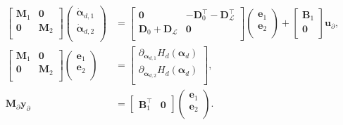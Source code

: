 \begin{equation}\label{eq:pHsys_findim_J1}
\begin{aligned}
\begin{bmatrix}
\mathbf{M}_1 & \mathbf{0} \\
\mathbf{0} & \mathbf{M}_2 \\
\end{bmatrix}
\begin{pmatrix}
\dot{\bm{\alpha}}_{d, 1} \\
\dot{\bm{\alpha}}_{d, 2} \\
\end{pmatrix}
&= \begin{bmatrix}
\mathbf{0} & -\mathbf{D}_{0}^\top - \mathbf{D}_{\mathcal{L}}^\top \\
\mathbf{D}_{0} + \mathbf{D}_{\mathcal{L}} & \mathbf{0} \\
\end{bmatrix} 
\begin{pmatrix}
\mathbf{e}_{1} \\
\mathbf{e}_{2} \\
\end{pmatrix} + 
\begin{bmatrix}
\mathbf{B}_1\\
\mathbf{0}\\
\end{bmatrix}
\mathbf{u}_\partial, \\
\begin{bmatrix}
\mathbf{M}_1 & \mathbf{0} \\
\mathbf{0} & \mathbf{M}_2 \\
\end{bmatrix}
\begin{pmatrix}
\mathbf{e}_{1} \\
\mathbf{e}_{2} \\
\end{pmatrix}
&= \begin{bmatrix}
\partial_{\bm{\alpha}_{d, 1}} H_d(\bm{\alpha}_d)\\
\partial_{\bm{\alpha}_{d, 2}} H_d(\bm{\alpha}_d)\\
\end{bmatrix}, \\
\mathbf{M}_\partial {\mathbf{y}_\partial} &= \begin{bmatrix}
\mathbf{B}_1^\top & \mathbf{0}
\end{bmatrix}\begin{pmatrix}
\mathbf{e}_{1} \\
\mathbf{e}_{2} \\
\end{pmatrix}.
\end{aligned}
\end{equation}

